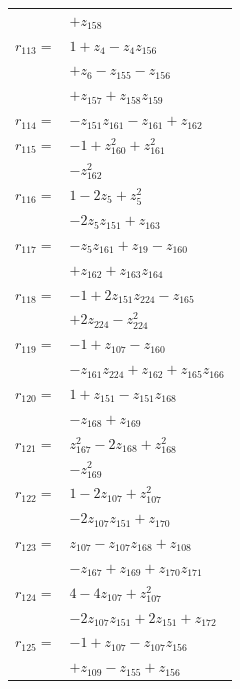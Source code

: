 \begin{longtable}{@{}r@{\;}l@{}}
 & \(\displaystyle +z_{158}\) \\[3pt]
\(r_{113}=\) & \(\displaystyle 1 +z_{4} -z_{4}z_{156}\) \\
 & \(\displaystyle +z_{6} -z_{155} -z_{156}\) \\
 & \(\displaystyle +z_{157} +z_{158}z_{159}\) \\[3pt]
\(r_{114}=\) & \(\displaystyle -z_{151}z_{161} -z_{161} +z_{162}\) \\[3pt]
\(r_{115}=\) & \(\displaystyle -1 +z_{160}^{2} +z_{161}^{2}\) \\
 & \(\displaystyle -z_{162}^{2}\) \\[3pt]
\(r_{116}=\) & \(\displaystyle 1 -2z_{5} +z_{5}^{2}\) \\
 & \(\displaystyle -2z_{5}z_{151} +z_{163}\) \\[3pt]
\(r_{117}=\) & \(\displaystyle -z_{5}z_{161} +z_{19} -z_{160}\) \\
 & \(\displaystyle +z_{162} +z_{163}z_{164}\) \\[3pt]
\(r_{118}=\) & \(\displaystyle -1 +2z_{151}z_{224} -z_{165}\) \\
 & \(\displaystyle +2z_{224} -z_{224}^{2}\) \\[3pt]
\(r_{119}=\) & \(\displaystyle -1 +z_{107} -z_{160}\) \\
 & \(\displaystyle -z_{161}z_{224} +z_{162} +z_{165}z_{166}\) \\[3pt]
\(r_{120}=\) & \(\displaystyle 1 +z_{151} -z_{151}z_{168}\) \\
 & \(\displaystyle -z_{168} +z_{169}\) \\[3pt]
\(r_{121}=\) & \(\displaystyle z_{167}^{2} -2z_{168} +z_{168}^{2}\) \\
 & \(\displaystyle -z_{169}^{2}\) \\[3pt]
\(r_{122}=\) & \(\displaystyle 1 -2z_{107} +z_{107}^{2}\) \\
 & \(\displaystyle -2z_{107}z_{151} +z_{170}\) \\[3pt]
\(r_{123}=\) & \(\displaystyle z_{107} -z_{107}z_{168} +z_{108}\) \\
 & \(\displaystyle -z_{167} +z_{169} +z_{170}z_{171}\) \\[3pt]
\(r_{124}=\) & \(\displaystyle 4 -4z_{107} +z_{107}^{2}\) \\
 & \(\displaystyle -2z_{107}z_{151} +2z_{151} +z_{172}\) \\[3pt]
\(r_{125}=\) & \(\displaystyle -1 +z_{107} -z_{107}z_{156}\) \\
 & \(\displaystyle +z_{109} -z_{155} +z_{156}\) \\

\end{longtable}

